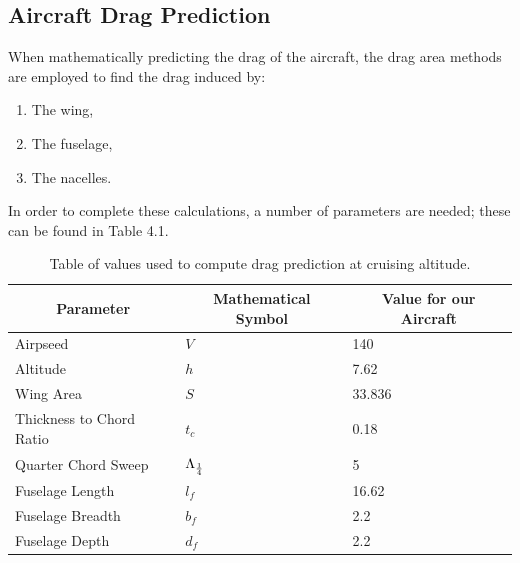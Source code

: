 \documentclass[stu, a4paper, 12pt, floatsintext]{apa7}
\numberwithin{figure}{section}
\numberwithin{table}{section}
\numberwithin{equation}{section}
\begin{document}
\subsection{Aircraft Drag Prediction}
When mathematically predicting the drag of the aircraft, the drag area methods are employed to find the drag induced by:
\begin{enumerate}
    \item The wing,
    \item The fuselage,
    \item The nacelles.
\end{enumerate}
In order to complete these calculations, a number of parameters are needed; these can be found in Table 4.1. 
\begin{table}[H]
    \centering
    \caption{Table of values used to compute drag prediction at cruising altitude.}
    \label{tab:drag_cruise_table}
    \begin{tabular}{@{}lll@{}}
    \toprule
    \multicolumn{1}{c}{\textbf{Parameter}} & \multicolumn{1}{c}{\textbf{Mathematical Symbol}} & \multicolumn{1}{c}{\textbf{Value for our Aircraft}} \\ \midrule
    Airpseed                               & $V$                                              & 140                                                 \\
    Altitude                               & $h$                                              & 7.62                                                \\
    Wing Area                              & $S$                                              & 33.836                                              \\
    Thickness to Chord Ratio               & $t_c$                                              & 0.18                                                \\
    Quarter Chord Sweep                    & $\Lambda_{{{1}\over{4}}}$                         & 5                                                   \\
    Fuselage Length                        & $l_f$                                            & 16.62                                               \\
    Fuselage Breadth                       & $b_f$                                            & 2.2                                                 \\
    Fuselage Depth                         & $d_f$                                            & 2.2                                                 \\

\end{tabular}
\end{table}
\end{document}
